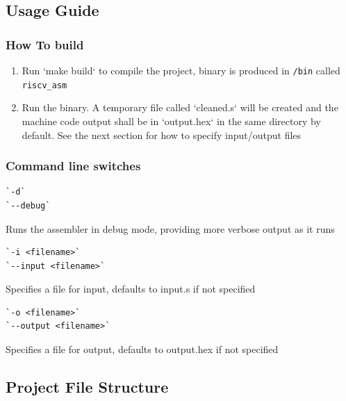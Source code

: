 \documentclass[12pt]{article}
\begin{document}
    \subsection{Usage Guide}

    \subsubsection*{How To build}
    \begin{enumerate}
        \item Run `make build` to compile the project, binary is produced in \verb#/bin# called \verb#riscv_asm#
        \item Run the binary. A temporary file called `cleaned.s` will be created and the machine code output shall be in `output.hex` in the same directory by default. 
    See the next section for how to specify input/output files
    \end{enumerate}
    
    \subsubsection*{Command line switches}
    \begin{verbatim}
`-d` 
`--debug`\end{verbatim}
    Runs the assembler in debug mode, providing more verbose output as it runs
    \\
    
    \begin{verbatim}
`-i <filename>`
`--input <filename>`\end{verbatim}
    Specifies a file for input, defaults to input.s if not specified
    \\
    
    \begin{verbatim}
`-o <filename>`
`--output <filename>`\end{verbatim}
    Specifies a file for output, defaults to output.hex if not specified

    \newpage
    \subsection{Project File Structure}
\end{document}

